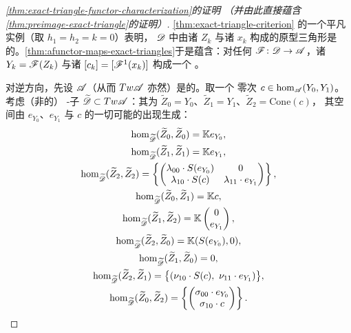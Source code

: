 \begin{proof}[\cref{thm:exact-triangle-functor-characterization}的证明%
（并由此直接蕴含\cref{thm:preimage-exact-triangle}的证明）]
\cref{thm:exact-triangle-criterion} 的一个平凡实例（取 $h_1=h_2=k=0$）表明，
$\mathscr{D}$ 中由诸\trObject{} $Z_k$ 与诸\trMorphism{} $x_k$ 构成的原型三角形是%
\trExact{}的。\cref{thm:afunctor-maps-exact-triangles}于是蕴含：对任何%
\trAFunctor{} $\mathscr{F}\colon\mathscr{D}\to\mathscr{A}$，诸\trObject{}%
$Y_k=\mathscr{F}(Z_k)$ 与诸\trMorphism{} $[c_k]=[\mathscr{F}^1(x_k)]$ 构成一个%
\trExactTriangle。

对逆方向，先设 $\mathscr{A}$（从而 $Tw\mathscr{A}$ 亦然）是\trStrictlyUnital{}的。取一个
零次\trCocycle{} $c\in\hom_{\mathscr{A}}(Y_0,Y_1)$。考虑（非\trFull{}的）
\trAinfty-子\trCategory{} $\widetilde{\mathscr{D}}\subset Tw\mathscr{A}$：其\trObject{}为
$\widetilde{Z}_0=Y_0$、$\widetilde{Z}_1=Y_1$、$\widetilde{Z}_2=\mathrm{Cone}(c)$，
其\trMorphism{}空间由 $e_{Y_0}$、$e_{Y_1}$ 与 $c$ 的一切可能的出现生成：
\begin{equation*}
\begin{gathered}
\hom_{\widetilde{\scr{D}}}(\widetilde{Z}_0,\widetilde{Z}_0)=\KK e_{Y_0},\\
\hom_{\widetilde{\scr{D}}}(\widetilde{Z}_1,\widetilde{Z}_1)=\KK e_{Y_1},\\
\hom_{\widetilde{\scr{D}}}(\widetilde{Z}_2,\widetilde{Z}_2)=
\left\{\begin{pmatrix}
\lambda_{00}\cdot S(e_{Y_0}) & 0\\
\lambda_{10}\cdot S(c) & \lambda_{11}\cdot e_{Y_1}
\end{pmatrix}\right\},\\
\hom_{\widetilde{\scr{D}}}(\widetilde{Z}_0,\widetilde{Z}_1)=\KK c,\\
\hom_{\widetilde{\scr{D}}}(\widetilde{Z}_1,\widetilde{Z}_2)=
\KK\begin{pmatrix}0\\ e_{Y_1}\end{pmatrix},\\
\hom_{\widetilde{\scr{D}}}(\widetilde{Z}_2,\widetilde{Z}_0)=\KK(S(e_{Y_0}),0),\\
\hom_{\widetilde{\scr{D}}}(\widetilde{Z}_1,\widetilde{Z}_0)=0,\\
\hom_{\widetilde{\scr{D}}}(\widetilde{Z}_2,\widetilde{Z}_1)=
\bigl\{(\nu_{10}\cdot S(c),\ \nu_{11}\cdot e_{Y_1})\bigr\},\\
\hom_{\widetilde{\scr{D}}}(\widetilde{Z}_0,\widetilde{Z}_2)=
\left\{\begin{pmatrix}\sigma_{00}\cdot e_{Y_0}\\ \sigma_{10}\cdot c\end{pmatrix}\right\}.

\end{gathered}
\end{equation*}
\end{proof}
